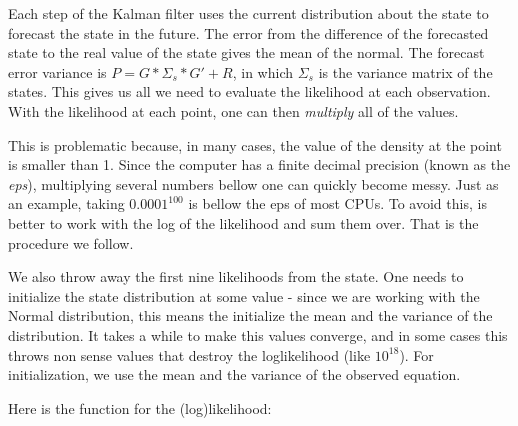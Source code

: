 \documentclass[12pt,a4paper]{article}
\begin{document}
Each step of the Kalman filter uses the current distribution about the state to forecast the state in the future. The error from the difference of the forecasted state to the real value of the state gives the mean of the normal. The forecast error variance is $P = G*\Sigma_s*G' + R$, in which $\Sigma_s$ is the variance matrix of the states. This gives us all we need to evaluate the likelihood at each observation. With the likelihood at each point, one can then \emph{multiply} all of the values.

This is problematic because, in many cases, the value of the density at the point is smaller than 1. Since the computer has a finite decimal precision (known as the \emph{eps}), multiplying several numbers bellow one can quickly become messy. Just as an example, taking $0.0001^{100}$ is bellow the eps of most CPUs. To avoid this, is better to work with the log of the likelihood and sum them over. That is the procedure we follow.

We also throw away the first nine likelihoods from the state. One needs to initialize the state distribution at some value - since we are working with the Normal distribution, this means the initialize the mean and the variance of the distribution. It takes a while to make this values converge, and in some cases this throws non sense values that destroy the loglikelihood (like $10^{18}$). For initialization, we use the mean and the variance of the observed equation.

Here is the function for the (log)likelihood:
\end{document}
